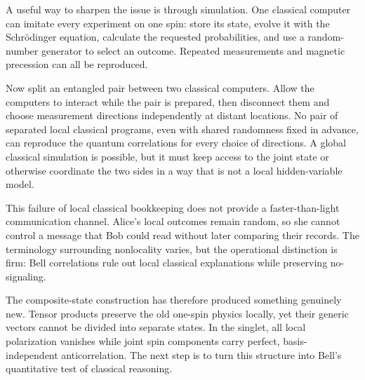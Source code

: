 A useful way to sharpen the issue is through simulation. One classical computer can imitate every experiment on one spin: store its state, evolve it with the Schr\"odinger equation, calculate the requested probabilities, and use a random-number generator to select an outcome. Repeated measurements and magnetic precession can all be reproduced.

Now split an entangled pair between two classical computers. Allow the computers to interact while the pair is prepared, then disconnect them and choose measurement directions independently at distant locations. No pair of separated local classical programs, even with shared randomness fixed in advance, can reproduce the quantum correlations for every choice of directions. A global classical simulation is possible, but it must keep access to the joint state or otherwise coordinate the two sides in a way that is not a local hidden-variable model.

This failure of local classical bookkeeping does not provide a faster-than-light communication channel. Alice's local outcomes remain random, so she cannot control a message that Bob could read without later comparing their records. The terminology surrounding nonlocality varies, but the operational distinction is firm: Bell correlations rule out local classical explanations while preserving no-signaling.

The composite-state construction has therefore produced something genuinely new. Tensor products preserve the old one-spin physics locally, yet their generic vectors cannot be divided into separate states. In the singlet, all local polarization vanishes while joint spin components carry perfect, basis-independent anticorrelation. The next step is to turn this structure into Bell's quantitative test of classical reasoning.
